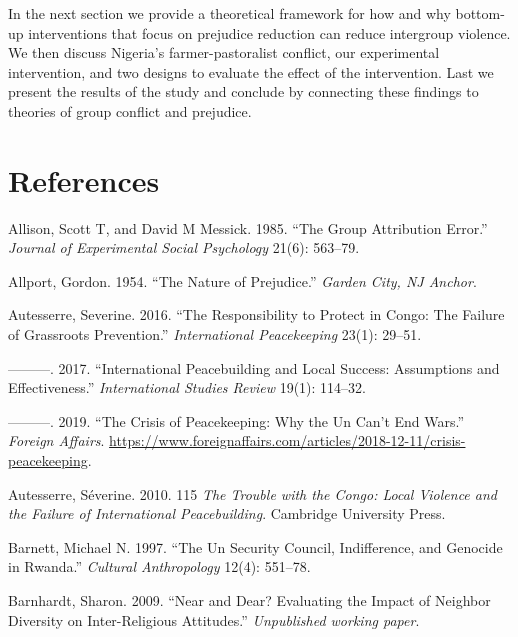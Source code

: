 \documentclass[11pt]{article}
\begin{document}
In the next section we provide a theoretical framework for how and why
bottom-up interventions that focus on prejudice reduction can reduce
intergroup violence. We then discuss Nigeria's farmer-pastoralist
conflict, our experimental intervention, and two designs to evaluate the
effect of the intervention. Last we present the results of the study and
conclude by connecting these findings to theories of group conflict and
prejudice.

\section*{References}\label{references}

\hypertarget{refs}{}
\hypertarget{ref-allison1985group}{}
Allison, Scott T, and David M Messick. 1985. ``The Group Attribution
Error.'' \emph{Journal of Experimental Social Psychology} 21(6):
563--79.

\hypertarget{ref-allport1954prejudice}{}
Allport, Gordon. 1954. ``The Nature of Prejudice.'' \emph{Garden City,
NJ Anchor}.

\hypertarget{ref-autesserre2016failure}{}
Autesserre, Severine. 2016. ``The Responsibility to Protect in Congo:
The Failure of Grassroots Prevention.'' \emph{International
Peacekeeping} 23(1): 29--51.

\hypertarget{ref-autesserre2017international}{}
---------. 2017. ``International Peacebuilding and Local Success:
Assumptions and Effectiveness.'' \emph{International Studies Review}
19(1): 114--32.

\hypertarget{ref-autesserre2019crisis}{}
---------. 2019. ``The Crisis of Peacekeeping: Why the Un Can't End
Wars.'' \emph{Foreign Affairs}.
\url{https://www.foreignaffairs.com/articles/2018-12-11/crisis-peacekeeping}.

\hypertarget{ref-autesserre2010trouble}{}
Autesserre, Séverine. 2010. 115 \emph{The Trouble with the Congo: Local
Violence and the Failure of International Peacebuilding}. Cambridge
University Press.

\hypertarget{ref-barnett1997security}{}
Barnett, Michael N. 1997. ``The Un Security Council, Indifference, and
Genocide in Rwanda.'' \emph{Cultural Anthropology} 12(4): 551--78.

\hypertarget{ref-barnhardt2009near}{}
Barnhardt, Sharon. 2009. ``Near and Dear? Evaluating the Impact of
Neighbor Diversity on Inter-Religious Attitudes.'' \emph{Unpublished
working paper}.
\end{document}
